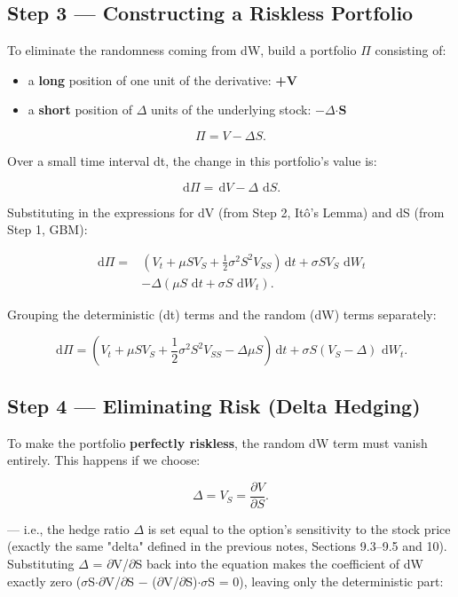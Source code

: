 \documentclass[12pt,openany]{book}
\theoremstyle{definition}
\theoremstyle{remark}
\newcommand{\dd}{\,\mathrm{d}}
\begin{document}
\subsection{Step 3 --- Constructing a Riskless Portfolio}

To eliminate the randomness coming from dW, build a portfolio \textbf{\(\Pi\)} consisting of:

\begin{itemize}
\item a \textbf{long} position of one unit of the derivative: \textbf{+V}


\item a \textbf{short} position of \(\Delta\) units of the underlying stock: \textbf{\(-\)\(\Delta\)\(\cdot\)S}


\end{itemize}

\[\Pi=V-\Delta S.\]

Over a small time interval dt, the change in this portfolio's value is:

\[\dd\Pi=\dd V-\Delta\,\dd S.\]

Substituting in the expressions for dV (from Step 2, Itô's Lemma) and dS (from Step 1, GBM):

\[
\begin{aligned}
\dd\Pi={}&\left(V_t+\mu SV_S+\frac12\sigma^2S^2V_{SS}\right)\dd t
+\sigma SV_S\,\dd W_t\\
&-\Delta\left(\mu S\,\dd t+\sigma S\,\dd W_t\right).
\end{aligned}
\]

Grouping the deterministic (dt) terms and the random (dW) terms separately:

\[
\dd\Pi=\left(V_t+\mu SV_S+\frac12\sigma^2S^2V_{SS}-\Delta\mu S\right)\dd t
+\sigma S(V_S-\Delta)\,\dd W_t.
\]

\subsection{Step 4 --- Eliminating Risk (Delta Hedging)}

To make the portfolio \textbf{perfectly riskless}, the random dW term must vanish entirely. This happens if we choose:

\[\Delta=V_S=\frac{\partial V}{\partial S}.\]

--- i.e., the hedge ratio \(\Delta\) is set equal to the option's sensitivity to the stock price (exactly the same "delta" defined in the previous notes, Sections 9.3--9.5 and 10). Substituting \(\Delta\) = \(\partial\)V/\(\partial\)S back into the equation makes the coefficient of dW exactly zero (\(\sigma\)S\(\cdot\)\(\partial\)V/\(\partial\)S \(-\) (\(\partial\)V/\(\partial\)S)\(\cdot\)\(\sigma\)S = 0), leaving only the deterministic part:
\end{document}
